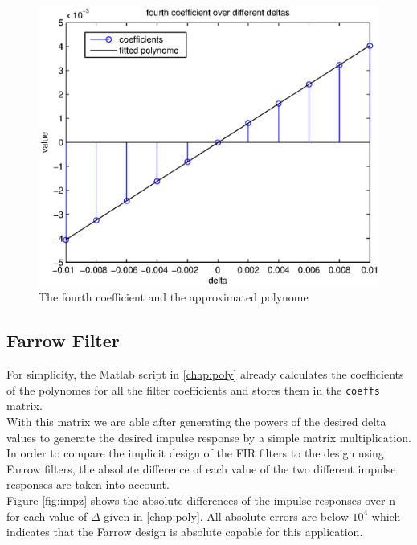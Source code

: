 \begin{figure}[h]
\centering
\includegraphics[width=\textwidth]{pics/fig4.eps}
\caption{The fourth coefficient and the approximated polynome}
\label{fig:coef3}
\end{figure}

\subsection{Farrow Filter}

For simplicity, the Matlab script in \ref{chap:poly} already calculates the coefficients of the polynomes for all the filter coefficients and stores them in the {\tt coeffs} matrix.\\
With this matrix we are able after generating the powers of the desired delta values to generate the desired impulse response by a simple matrix multiplication.\\
In order to compare the implicit design of the FIR filters to the design using Farrow filters, the absolute difference of each value of the two different impulse responses are taken into account.\\
Figure \ref{fig:impz} shows the absolute differences of the impulse responses over n for each value of $\Delta$ given in \ref{chap:poly}. All absolute errors are below $10^4$ which indicates that the Farrow design is absolute capable for this application.

